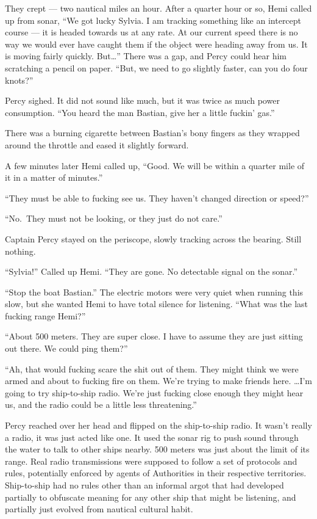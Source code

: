 \documentclass[]{scrbook}
\begin{document}
They crept --- two nautical miles an hour. After a quarter hour or so,
Hemi called up from sonar, ``We got lucky Sylvia. I am tracking
something like an intercept course --- it is headed towards us at any
rate. At our current speed there is no way we would ever have caught
them if the object were heading away from us. It is moving fairly
quickly. But\ldots{}'' There was a gap, and Percy could hear him
scratching a pencil on paper. ``But, we need to go slightly faster, can
you do four knots?''

Percy sighed. It did not sound like much, but it was twice as much power
consumption. ``You heard the man Bastian, give her a little fuckin'
gas.''

There was a burning cigarette between Bastian's bony fingers as they
wrapped around the throttle and eased it slightly forward.

A few minutes later Hemi called up, ``Good. We will be within a quarter
mile of it in a matter of minutes.''

``They must be able to fucking see us. They haven't changed direction or
speed?''

``No.~They must not be looking, or they just do not care.''

Captain Percy stayed on the periscope, slowly tracking across the
bearing. Still nothing.

``Sylvia!'' Called up Hemi. ``They are gone. No detectable signal on the
sonar.''

``Stop the boat Bastian.'' The electric motors were very quiet when
running this slow, but she wanted Hemi to have total silence for
listening. ``What was the last fucking range Hemi?''

``About 500 meters. They are super close. I have to assume they are just
sitting out there. We could ping them?''

``Ah, that would fucking scare the shit out of them. They might think we
were armed and about to fucking fire on them. We're trying to make
friends here. \ldots{}I'm going to try ship-to-ship radio. We're just
fucking close enough they might hear us, and the radio could be a little
less threatening.''

Percy reached over her head and flipped on the ship-to-ship radio. It
wasn't really a radio, it was just acted like one. It used the sonar rig
to push sound through the water to talk to other ships nearby. 500
meters was just about the limit of its range. Real radio transmissions
were supposed to follow a set of protocols and rules, potentially
enforced by agents of Authorities in their respective territories.
Ship-to-ship had no rules other than an informal argot that had
developed partially to obfuscate meaning for any other ship that might
be listening, and partially just evolved from nautical cultural habit.
\end{document}
